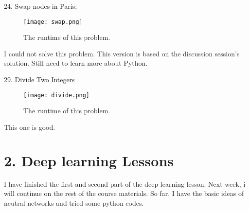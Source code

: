 \documentclass[a4paper]{article}
\begin{document}
24. Swap nodes in Paris; \\
\begin{figure}[H]
\begin{center}
\texttt{[image: swap.png]}
\end{center}
\caption{The runtime of this problem.}
\label{fig5}
\end{figure}
I could not solve this problem. This version is based on the discussion session's solution.  Still need to learn more about Python.

29. Divide Two Integers\\
\begin{figure}[H]
\begin{center}
\texttt{[image: divide.png]}
\end{center}
\caption{The runtime of this problem.}
\label{fig6}
\end{figure}
This one is good. 

\section{2. Deep learning Lessons}
I have finished the first and second part of the deep learning lesson. Next week, i will continue on the rest of the course materials. So far, I have the basic ideas of neutral networks and tried some python codes. 
\end{document}
